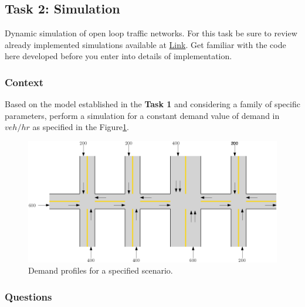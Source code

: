 \documentclass[]{book}
\theoremstyle{definition}
\theoremstyle{definition}
\theoremstyle{definition}
\theoremstyle{remark}
\begin{document}
\hypertarget{task-2-simulation}{%
\subsection*{Task 2: Simulation}\label{task-2-simulation}}

Dynamic simulation of open loop traffic networks. For this task be sure
to review already implemented simulations available at
\href{https://github.com/andres-ladino-ifsttar/traffic-macrosimulator}{Link}.
Get familiar with the code here developed before you enter into details
of implementation.

\hypertarget{context-2}{%
\subsubsection*{Context}\label{context-2}}

Based on the model established in the \textbf{Task 1} and considering a
family of specific parameters, perform a simulation for a constant
demand value of demand in \(veh/hr\) as specified in the
Figure\ref{fig:flow}.



\begin{figure}

{\centering \includegraphics{images/p1-02-flows} 

}

\caption{Demand profiles for a specified scenario.}\label{fig:flow}
\end{figure}

\hypertarget{questions-1}{%
\subsubsection*{Questions}\label{questions-1}}
\end{document}
